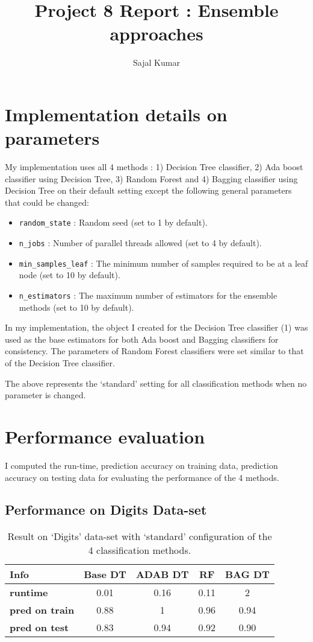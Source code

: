 \documentclass[12pt]{article}
\title{\textbf{Project 8 Report : Ensemble approaches}}
\author{Sajal Kumar}
\date{}
\begin{document}
\maketitle

\section*{Implementation details on parameters}

My implementation uses all 4 methods : 1) Decision Tree classifier, 2) Ada boost classifier using Decision Tree, 3) Random Forest and 4) Bagging classifier using Decision Tree on their default setting except the following general parameters that could be changed:

\begin{itemize}
\item \texttt{random\_state} : Random seed (set to 1 by default).
\item \texttt{n\_jobs} : Number of parallel threads allowed (set to 4 by default).
\item \texttt{min\_samples\_leaf} : The minimum number of samples required to be at a leaf node (set to 10 by default).
\item \texttt{n\_estimators} : The maximum number of estimators for the ensemble methods (set to 10 by default).
\end{itemize}

In my implementation, the object I created for the Decision Tree classifier (1) was used as the base estimators for both Ada boost and Bagging classifiers for consistency. The parameters of Random Forest classifiers were set similar to that of the Decision Tree classifier.

The above represents the `standard' setting for all classification methods when no parameter is changed. 

\section*{Performance evaluation}

I computed the run-time, prediction accuracy on training data, prediction accuracy on testing data for evaluating the performance of the 4 methods.

\subsection*{Performance on Digits Data-set}

\begin{table}[!hptb]
\centering
\begin{tabular}{|l|c|c|c|c|}
\hline
\textbf{Info} & \textbf{Base DT} & \textbf{ADAB DT} & \textbf{RF} & \textbf{BAG DT} \\\hline
\textbf{runtime} & 0.01 & 0.16 & 0.11 & 2 \\
\textbf{pred on train} & 0.88 & 1 & 0.96 & 0.94 \\
\textbf{pred on test} & 0.83 & 0.94 & 0.92 & 0.90 \\\hline
\end{tabular}
\caption{Result on `Digits' data-set with `standard' configuration of the 4 classification methods.}
\end{table}
\end{document}
